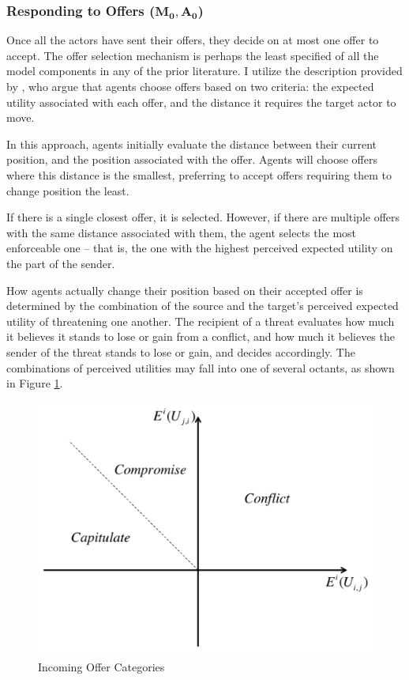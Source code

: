 \subsubsection{Responding to Offers ($\mathbf{M_0, A_0}$)} \label{challenges}

Once all the actors have sent their offers, they decide on at most one offer to accept. The offer selection mechanism is perhaps the least specified of all the model components in any of the prior literature. I utilize the description provided by \citet{scholz_2011}, who argue that agents choose offers based on two criteria: the expected utility associated with each offer, and the distance it requires the target actor to move.

In this approach, agents initially evaluate the distance between their current position, and the position associated with the offer. Agents will choose offers where this distance is the smallest, preferring to accept offers requiring them to change position the least.

If there is a single closest offer, it is selected. However, if there are multiple offers with the same distance associated with them, the agent selects the most enforceable one -- that is, the one with the highest perceived expected utility on the part of the sender.

How agents actually change their position based on their accepted offer is determined by the combination of the source and the target's perceived expected utility of threatening one another. The recipient of a threat evaluates how much it believes it stands to lose or gain from a conflict, and how much it believes the sender of the threat stands to lose or gain, and decides accordingly. The combinations of perceived utilities may fall into one of several octants, as shown in Figure \ref{fig:octants}.

\begin{figure}
  \centering
  \includegraphics[scale=0.5]{BDM_Reproduction/Figures/Octants}
  \caption{Incoming Offer Categories}
  \label{fig:octants}
  \figSpace
\end{figure}

